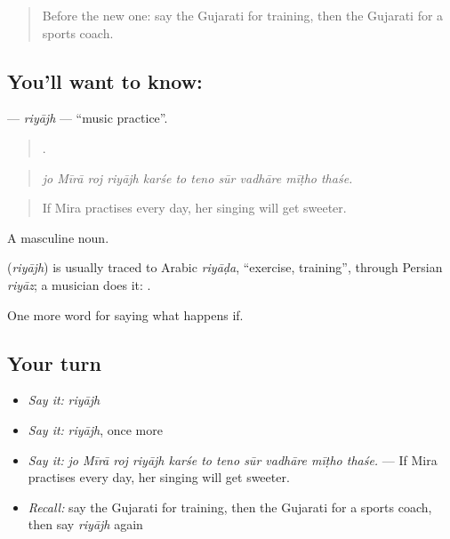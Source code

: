 \begin{quote}
Before the new one: say the Gujarati for training, then the Gujarati for a sports coach.
\end{quote}

\subsection*{You'll want to know: }
\textbf{} — \emph{riyājh} — \textquotedblleft{}music practice\textquotedblright{}.

\begin{quote}
          .
\end{quote}

\begin{quote}
\emph{jo Mīrā roj riyājh karśe to teno sūr vadhāre mīṭho thaśe.}
\end{quote}

\begin{quote}
If Mira practises every day, her singing will get sweeter.
\end{quote}

A masculine noun.

\begin{cousinweb}
\textbf{} (\emph{riyājh}) is usually traced to Arabic \emph{riyāḍa}, \textquotedblleft{}exercise, training\textquotedblright{}, through Persian \emph{riyāz}; a musician does it: \textbf{ }.
\end{cousinweb}

\begin{grammarlens}[title={What you've built}]
One more word for saying what happens if.
\end{grammarlens}

\subsection*{Your turn}
\begin{itemize}
\raggedright
  \item \emph{Say it:} \emph{riyājh}
  \item \emph{Say it:} \emph{riyājh}, once more
  \item \emph{Say it:} \emph{jo Mīrā roj riyājh karśe to teno sūr vadhāre mīṭho thaśe.} — If Mira practises every day, her singing will get sweeter.
  \item \emph{Recall:} say the Gujarati for training, then the Gujarati for a sports coach, then say \emph{riyājh} again
\end{itemize}

